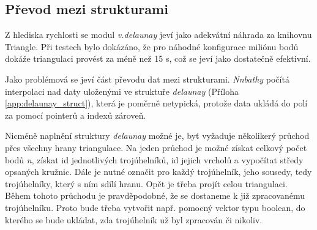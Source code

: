 \documentclass[12pt,a4paper]{article}
\begin{document}
\begin{figure}[h!]
\centering
\begin{floatrow}
\end{floatrow}
\end{figure}

\subsection{Převod mezi strukturami}
Z hlediska rychlosti se modul \emph{v.delaunay} jeví jako adekvátní náhrada za knihovnu Triangle. Při testech bylo dokázáno, že pro náhodné konfigurace miliónu bodů dokáže triangulaci provést za méně než 15 s, což se jeví jako dostatečně efektivní.

Jako problémová se jeví část převodu dat mezi strukturami. \emph{Nnbathy} počítá interpolaci nad daty uloženými ve struktuře \emph{delaunay} (Příloha \ref{app:delaunay_struct}), která je poměrně netypická, protože data ukládá do polí za pomocí pointerů a indexů zároveň. 

Nicméně naplnění struktury \emph{delaunay} možné je,  byť vyžaduje několikerý průchod přes všechny hrany triangulace. Na jeden průchod je možné získat celkový počet bodů \emph{n}, získat id jednotlivých trojúhelníků, id jejich vrcholů a vypočítat středy opsaných kružnic. Dále je nutné označit pro každý trojúhelník, jeho sousedy, tedy trojúhelníky, který s ním sdílí hranu. Opět je třeba projít celou triangulaci. Během tohoto průchodu je pravděpodobné, že se dostaneme k již zpracovanému trojúhelníku. Proto bude třeba vytvořit např. pomocný vektor typu boolean, do kterého se bude ukládat, zda trojúhelník už byl zpracován či nikoliv.
\end{document}

